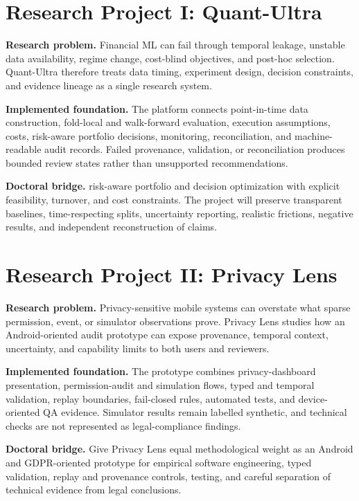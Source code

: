 \documentclass[11pt]{article}
\begin{document}
\section*{Research Project I: Quant-Ultra}
\textbf{Research problem.} Financial ML can fail through temporal leakage, unstable data availability, regime change, cost-blind objectives, and post-hoc selection. Quant-Ultra therefore treats data timing, experiment design, decision constraints, and evidence lineage as a single research system.

\textbf{Implemented foundation.} The platform connects point-in-time data construction, fold-local and walk-forward evaluation, execution assumptions, costs, risk-aware portfolio decisions, monitoring, reconciliation, and machine-readable audit records. Failed provenance, validation, or reconciliation produces bounded review states rather than unsupported recommendations.

\textbf{Doctoral bridge.} risk-aware portfolio and decision optimization with explicit feasibility, turnover, and cost constraints. The project will preserve transparent baselines, time-respecting splits, uncertainty reporting, realistic frictions, negative results, and independent reconstruction of claims.

\section*{Research Project II: Privacy Lens}
\textbf{Research problem.} Privacy-sensitive mobile systems can overstate what sparse permission, event, or simulator observations prove. Privacy Lens studies how an Android-oriented audit prototype can expose provenance, temporal context, uncertainty, and capability limits to both users and reviewers.

\textbf{Implemented foundation.} The prototype combines privacy-dashboard presentation, permission-audit and simulation flows, typed and temporal validation, replay boundaries, fail-closed rules, automated tests, and device-oriented QA evidence. Simulator results remain labelled synthetic, and technical checks are not represented as legal-compliance findings.

\textbf{Doctoral bridge.} Give Privacy Lens equal methodological weight as an Android and GDPR-oriented prototype for empirical software engineering, typed validation, replay and provenance controls, testing, and careful separation of technical evidence from legal conclusions.
\end{document}
